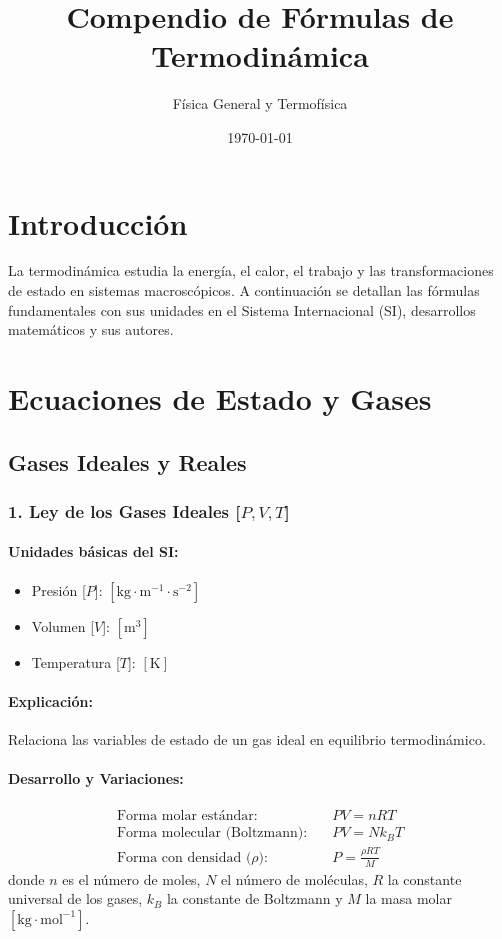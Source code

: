 \documentclass[12pt,a4paper]{article}
\title{\textbf{Compendio de Fórmulas de Termodinámica}}
\author{Física General y Termofísica}
\date{\today}
\begin{document}
\maketitle

\section*{Introducción}
La termodinámica estudia la energía, el calor, el trabajo y las transformaciones de estado en sistemas macroscópicos. A continuación se detallan las fórmulas fundamentales con sus unidades en el Sistema Internacional (SI), desarrollos matemáticos y sus autores.

\section{Ecuaciones de Estado y Gases}

\subsection{Gases Ideales y Reales}

\subsubsection*{1. Ley de los Gases Ideales [$P, V, T$]}
\paragraph*{Unidades básicas del SI:}
\begin{itemize}
    \item Presión [$P$]: $[\text{kg}\cdot\text{m}^{-1}\cdot\text{s}^{-2}]$
    \item Volumen [$V$]: $[\text{m}^3]$
    \item Temperatura [$T$]: $[\text{K}]$
\end{itemize}
\paragraph*{Explicación:} Relaciona las variables de estado de un gas ideal en equilibrio termodinámico.
\paragraph*{Desarrollo y Variaciones:}
\begin{align*}
\text{Forma molar estándar:} \quad & P V = n R T \\
\text{Forma molecular (Boltzmann):} \quad & P V = N k_B T \\
\text{Forma con densidad ($\rho$):} \quad & P = \frac{\rho R T}{M}
\end{align*}
donde $n$ es el número de moles, $N$ el número de moléculas, $R$ la constante universal de los gases, $k_B$ la constante de Boltzmann y $M$ la masa molar $[\text{kg}\cdot\text{mol}^{-1}]$.
\end{document}
